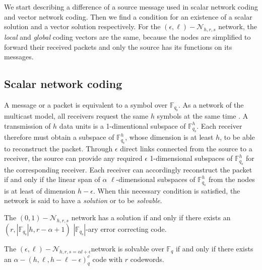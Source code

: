 We start describing a difference of a source message used in scalar
network coding and vector network coding. Then we find a condition
for an existence of a scalar solution and a vector solution respectively.
For the $(\epsilon,\ell)-\mathcal{N}_{h,r,s}$ network, the \textit{local}
and \textit{global} coding vectors are the same, because the nodes
are simplified to forward their received packets and only the source
has its functions on its messages.

\subsection{Scalar network coding \label{subsec:Scalar-network-coding}}

A message or a packet is equivalent to a symbol over $\ensuremath{\mathbb{F}}_{q_{\mathrm{s}}}$.
As a network of the multicast model, all receivers request the same
$h$ symbols at the same time \cite{Trautmann:2013}. A transmission
of $h$ data units is a 1-dimentional subspace of $\ensuremath{\mathbb{F}}_{q_{\mathrm{s}}}^{h}$.
Each receiver therefore must obtain a subspace of $\ensuremath{\mathbb{F}}_{q_{\mathrm{s}}}^{h}$,
whose dimension is at least $h$, to be able to reconstruct the packet.
Through $\epsilon$ direct links connected from the source to a receiver,
the source can provide any required $\epsilon$ 1-dimensional subspaces
of $\ensuremath{\mathbb{F}}_{q_{\mathrm{s}}}^{h}$ for the corresponding
receiver. Each receiver can accordingly reconstruct the packet if
and only if the linear span of $\alpha$ $\ell$-dimensional subspaces
of $\ensuremath{\mathbb{F}}_{q_{\mathrm{s}}}^{h}$ from the nodes
is at least of dimension $h-\epsilon$. When this necessary condition
is satisfied, the network is said to have a \textit{solution} or to
be \textit{solvable}.
\begin{thm}
 The $(0,1)-\mathcal{N}_{h,r,s}$ network has a solution if and only
if there exists an $\left(r,\left|\ensuremath{\mathbb{F}}_{q_{\mathrm{s}}}\right|h,r-\alpha+1\right)$
$\left|\ensuremath{\mathbb{F}}_{q_{\mathrm{s}}}\right|$-ary error
correcting code. 
\end{thm}
%
\begin{thm}
 The $(\epsilon,\ell)-\mathcal{N}_{h,r,s=\alpha l+\epsilon}$network
is solvable over $\ensuremath{\mathbb{F}}_{q}$ if and only if there
exists an $\alpha-\left(h,\ell,h-\ell-\epsilon\right)_{q}^{c}$ code
with $r$ codewords. \label{theo:scalar_sol_exist}
\end{thm}

